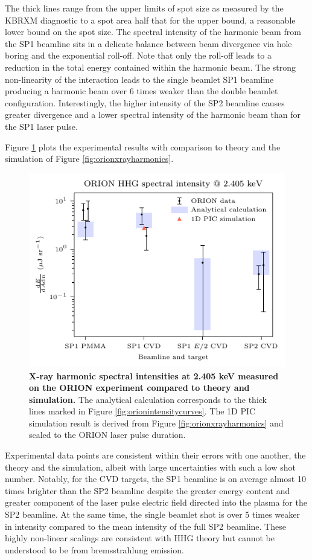 The thick lines range from the upper limits of spot size as measured by the KBRXM diagnostic to a spot area half that for the upper bound, a reasonable lower bound on the spot size. The spectral intensity of the harmonic beam from the SP1 beamline sits in a delicate balance between beam divergence via hole boring and the exponential roll-off. Note that only the roll-off leads to a reduction in the total energy contained within the harmonic beam. The strong non-linearity of the interaction leads to the single beamlet SP1 beamline producing a harmonic beam over 6 times weaker than the double beamlet configuration. Interestingly, the higher intensity of the SP2 beamline causes greater divergence and a lower spectral intensity of the harmonic beam than for the SP1 laser pulse.

Figure \ref{fig:orionexperimentresults} plots the experimental results with comparison to theory and the simulation of Figure \ref{fig:orionxrayharmonics}. 
\begin{figure}
	\centering
	\includegraphics{figures/orion/orion_experiment_results}
	\caption[X-ray harmonic intensities measured on the ORION experiment compared to theory and simulation.]{\textbf{X-ray harmonic spectral intensities at 2.405 keV measured on the ORION experiment compared to theory and simulation.} The analytical calculation corresponds to the thick lines marked in Figure \ref{fig:orionintensitycurves}. The 1D PIC simulation result is derived from Figure \ref{fig:orionxrayharmonics} and scaled to the ORION laser pulse duration.}
	\label{fig:orionexperimentresults}
\end{figure}
Experimental data points are consistent within their errors with one another, the theory and the simulation, albeit with large uncertainties with such a low shot number. Notably, for the CVD targets, the SP1 beamline is on average almost 10 times brighter than the SP2 beamline despite the greater energy content and greater component of the laser pulse electric field directed into the plasma for the SP2 beamline. At the same time, the single beamlet shot is over 5 times weaker in intensity compared to the mean intensity of the full SP2 beamline. These highly non-linear scalings are consistent with HHG theory but cannot be understood to be from bremsstrahlung emission. 

